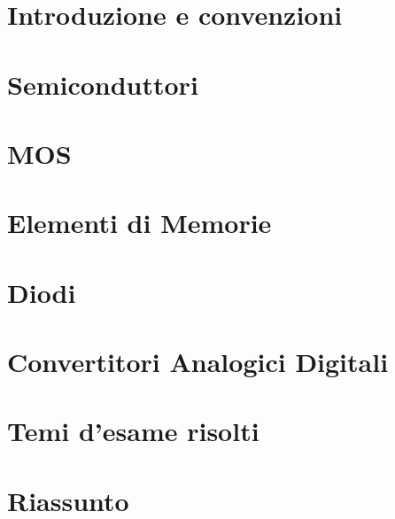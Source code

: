 \providecommand{\main}{.}






{\hypersetup{hidelinks}
  \tableofcontents  %
}

\clearpage
\chapter{Introduzione e convenzioni}
\clearpage

\clearpage
\chapter{Semiconduttori}
\clearpage

\clearpage
\chapter{MOS}
\clearpage

\clearpage
\chapter{Elementi di Memorie}
\clearpage

\clearpage
\chapter{Diodi}
\clearpage

\clearpage
\chapter{Convertitori Analogici Digitali}
\clearpage

\clearpage


\appendix
%
\chapter{Temi d'esame risolti}
\clearpage

\clearpage
\chapter{Riassunto}
\clearpage

\clearpage




